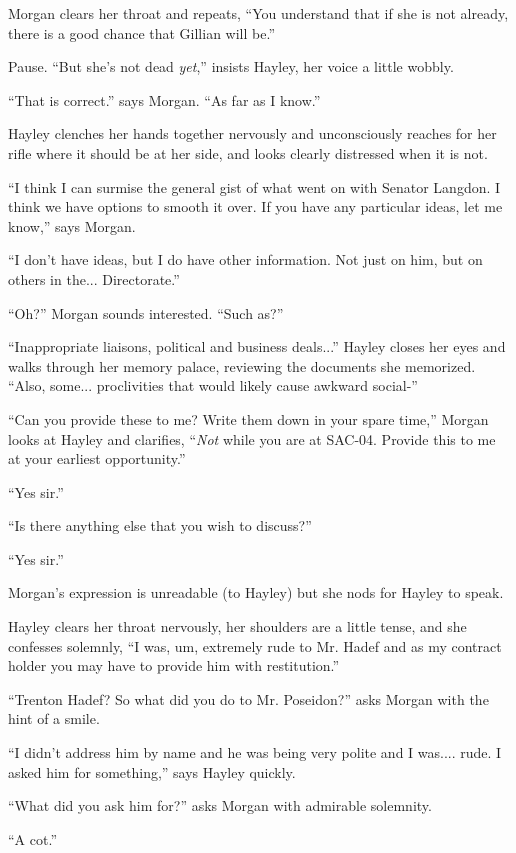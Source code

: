 Morgan clears her throat and repeats, ``You understand that if she is not already, there is a good chance that Gillian will be.''

Pause.  ``But she's not dead \textit{yet},'' insists Hayley, her voice a little wobbly.  

``That is correct.'' says Morgan. ``As far as I know.''

Hayley clenches her hands together nervously and unconsciously reaches for her rifle where it should be at her side, and looks clearly distressed when it is not.

``I think I can surmise the general gist of what went on with Senator Langdon.  I think we have options to smooth it over.  If you have any particular ideas, let me know,'' says Morgan.

``I don't have ideas, but I do have other information.  Not just on him, but on others in the... Directorate.''

``Oh?'' Morgan sounds interested.  ``Such as?''

``Inappropriate liaisons, political and business deals...'' Hayley closes her eyes and walks through her memory palace, reviewing the documents she memorized.  ``Also, some... proclivities that would likely cause awkward social-''

``Can you provide these to me?  Write them down in your spare time,'' Morgan looks at Hayley and clarifies, ``\textit{Not} while you are at SAC-04.  Provide this to me at your earliest opportunity.''

``Yes sir.''

``Is there anything else that you wish to discuss?''

``Yes sir.''

Morgan's expression is unreadable (to Hayley) but she nods for Hayley to speak.

Hayley clears her throat nervously, her shoulders are a little tense, and she confesses solemnly, ``I was, um, extremely rude to Mr. Hadef and as my contract holder you may have to provide him with restitution.''

``Trenton Hadef?  So what did you do to Mr. Poseidon?'' asks Morgan with the hint of a smile.

``I didn't address him by name and he was being very polite and I was.... rude.  I asked him for something,'' says Hayley quickly.

``What did you ask him for?'' asks Morgan with admirable solemnity.

``A cot.''

